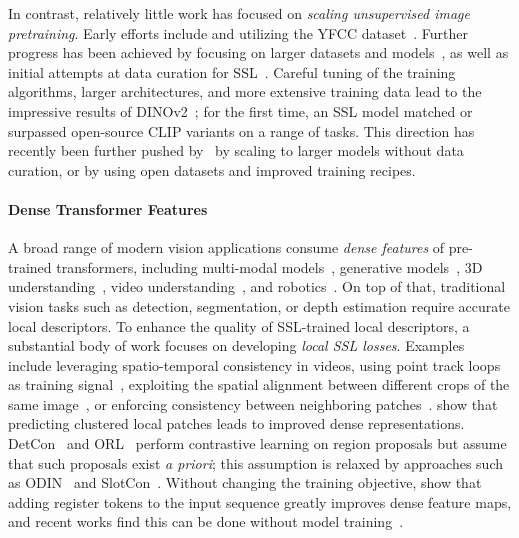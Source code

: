 In contrast, relatively little work has focused on \emph{scaling unsupervised image pretraining}.
Early efforts include \citet{caron2019unsupervised} and \citet{goyal2019scaling} utilizing the YFCC dataset~\citep{thomee2016yfcc100m}.
Further progress has been achieved by focusing on larger datasets and models~\citep{goyal2021self, goyal2022vision}, as well as initial attempts at data curation for SSL~\citep{tian2021divide}.
Careful tuning of the training algorithms, larger architectures, and more extensive training data lead to the impressive results of DINOv2~\citep{oquab2024dinov2}; for the first time, an SSL model matched or surpassed open-source CLIP variants on a range of tasks. 
This direction has recently been further pushed by~\citet{fan2025scaling} by scaling to larger models without data curation, or by \citet{venkataramanan2025franca} using open datasets and improved training recipes.

\paragraph{Dense Transformer Features}


A broad range of modern vision applications consume \emph{dense features} of pre-trained transformers, including multi-modal models~\citep{liu2023llava,beyer2024paligemma}, generative models~\citep{yu2024repa,yao2025reconstruction}, 3D understanding~\citep{wang2025vggt}, video understanding~\citep{lin2023video,wang2024internvideo2}, and robotics~\citep{driess2023palme,kim24openvla}.
On top of that, traditional vision tasks such as detection, segmentation, or depth estimation require accurate local descriptors.
To enhance the quality of SSL-trained local descriptors, a substantial body of work focuses on developing \emph{local SSL losses}.
Examples include leveraging spatio-temporal consistency in videos, \eg using point track loops as training signal~\citep{jabri2020space}, exploiting the spatial alignment between different crops of the same image~\citep{pinheiro2020unsupervised,bardes2022vicregl}, or enforcing consistency between neighboring patches~\citep{yun2022patch}.
\citet{darcet2025cluster} show that predicting clustered local patches leads to improved dense representations.
DetCon~\citep{henaff2021efficient} and ORL~\citep{xie2021unsupervised} perform contrastive learning on region proposals but assume that such proposals exist \emph{a priori}; this assumption is relaxed by approaches such as ODIN~\citep{henaff2022object} and SlotCon~\citep{wen2022slotcon}.
Without changing the training objective, \citet{darcet2024vision} show that adding register tokens to the input sequence greatly improves dense feature maps, and recent works find this can be done without model training~\citep{jiang2025vision, chen2025vision}.
 
